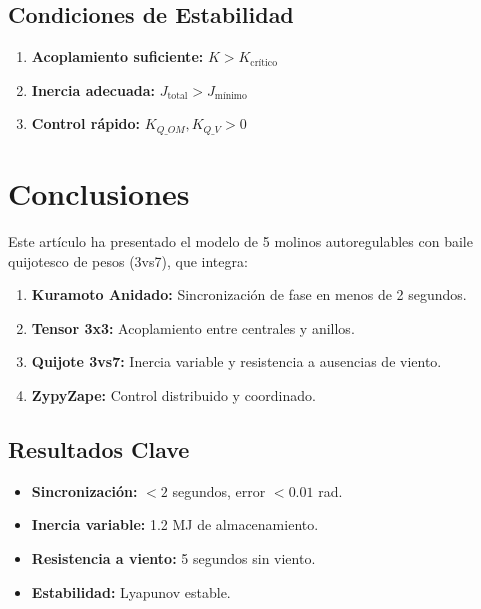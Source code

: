 \documentclass[12pt,a4paper]{article}
\begin{document}
\subsection{Condiciones de Estabilidad}

\begin{enumerate}
    \item \textbf{Acoplamiento suficiente:} $K > K_{\text{crítico}}$
    \item \textbf{Inercia adecuada:} $J_{\text{total}} > J_{\text{mínimo}}$
    \item \textbf{Control rápido:} $K_{Q\_OM}, K_{Q\_V} > 0$
\end{enumerate}

\section{Conclusiones}

Este artículo ha presentado el modelo de 5 molinos autoregulables con baile quijotesco de pesos (3vs7), que integra:

\begin{enumerate}
    \item \textbf{Kuramoto Anidado:} Sincronización de fase en menos de 2 segundos.
    \item \textbf{Tensor 3x3:} Acoplamiento entre centrales y anillos.
    \item \textbf{Quijote 3vs7:} Inercia variable y resistencia a ausencias de viento.
    \item \textbf{ZypyZape:} Control distribuido y coordinado.
\end{enumerate}

\subsection{Resultados Clave}

\begin{itemize}
    \item \textbf{Sincronización:} $<2$ segundos, error $<0.01$ rad.
    \item \textbf{Inercia variable:} 1.2 MJ de almacenamiento.
    \item \textbf{Resistencia a viento:} 5 segundos sin viento.
    \item \textbf{Estabilidad:} Lyapunov estable.
\end{itemize}
\end{document}
